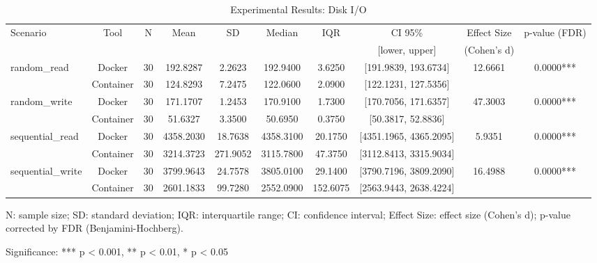 \documentclass{article}
\begin{document}

\begin{table}[h]
\centering
\small
\caption{Experimental Results: Disk I/O}
\label{tab:disk_i_o}
\begin{tabular}{lccccccccc}
\toprule
Scenario & Tool & N & Mean & SD & Median & IQR & CI 95\% & Effect Size & p-value (FDR) \\
 & & & & & & & [lower, upper] & (Cohen's d) & \\
\midrule
\multirow{2}{*}{random\_read} & Docker & 30 & 192.8287 & 2.2623 & 192.9400 & 3.6250 & [191.9839, 193.6734] & 12.6661 & 0.0000*** \\
 & Container & 30 & 124.8293 & 7.2475 & 122.0600 & 2.0900 & [122.1231, 127.5356] &  &  \\
\midrule
\multirow{2}{*}{random\_write} & Docker & 30 & 171.1707 & 1.2453 & 170.9100 & 1.7300 & [170.7056, 171.6357] & 47.3003 & 0.0000*** \\
 & Container & 30 & 51.6327 & 3.3500 & 50.6950 & 0.3750 & [50.3817, 52.8836] &  &  \\
\midrule
\multirow{2}{*}{sequential\_read} & Docker & 30 & 4358.2030 & 18.7638 & 4358.3100 & 20.1750 & [4351.1965, 4365.2095] & 5.9351 & 0.0000*** \\
 & Container & 30 & 3214.3723 & 271.9052 & 3115.7800 & 47.3750 & [3112.8413, 3315.9034] &  &  \\
\midrule
\multirow{2}{*}{sequential\_write} & Docker & 30 & 3799.9643 & 24.7578 & 3805.0100 & 29.1400 & [3790.7196, 3809.2090] & 16.4988 & 0.0000*** \\
 & Container & 30 & 2601.1833 & 99.7280 & 2552.0900 & 152.6075 & [2563.9443, 2638.4224] &  &  \\
\midrule
\bottomrule
\end{tabular}
\begin{tablenotes}
\small
\item N: sample size; SD: standard deviation; IQR: interquartile range; CI: confidence interval; Effect Size: effect size (Cohen's d); p-value corrected by FDR (Benjamini-Hochberg).
\item Significance: *** p < 0.001, ** p < 0.01, * p < 0.05
\end{tablenotes}
\end{table}
\end{document}
